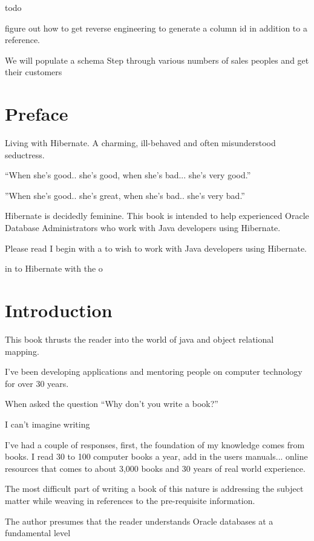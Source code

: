 \documentclass[letterpaper,10pt]{book}
\title{}
\author{Jim Schmidt}
\begin{document}
\maketitle
todo

figure out how to get reverse engineering to generate a column id in addition to a reference.

We will populate a schema 
   Step through various numbers of sales peoples and get their customers
\chapter{Preface}
Living with Hibernate.  A charming, ill-behaved and often misunderstood seductress.

``When she's good.. she's good, when she's bad... she's very good.''

''When she's good.. she's great, when she's bad.. she's very bad.''

Hibernate is decidedly feminine.  
This book is intended to help experienced Oracle Database Administrators who work with Java developers using Hibernate.

Please read 
I begin with a 
to wish to work with Java developers using
Hibernate.

 in to Hibernate with the o

 

\chapter{Introduction}
This book thrusts the reader into the world of java and object relational mapping.  

I've been developing applications and mentoring people on computer technology for over 30 years. 

When asked the question ``Why don't you write a book?''

I can't imagine writing 

I've had a couple of responses, first, the foundation of my knowledge comes from books.  I read  30 to 100 computer books a year,  add in the users manuals... online resources that comes to about 3,000 books and 30 years of real world experience.



The most difficult part of writing a book of this nature is addressing the
 subject matter while weaving in references to the pre-requisite information.

The author presumes that the reader understands Oracle databases at a fundamental level
\end{document}
